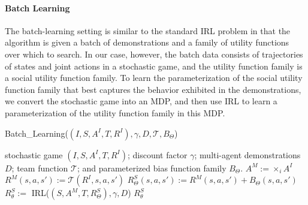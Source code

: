 
\vspace{\up}
\paragraph{Batch Learning}
\label{sec:batch}

The batch-learning setting is similar to the standard IRL problem in
that the algorithm is given a batch of demonstrations and a family of
utility functions over which to search. In our case, however, the batch
data consists of trajectories of states and joint actions in a
stochastic game, and the utility function family is a social utility
function family.  To learn the parameterization of the social utility
function family that best captures the behavior exhibited in the
demonstrations, we convert the stochastic game into an MDP,
and then use IRL to learn a parameterization of the utility function
family in this MDP.

\begin{algorithm}[t]
\caption{Batch\_Learning($(I,S,A^I,T,R^I), \gamma, D, {\mathcal T}, B_\Theta$)}
\label{alg:srl}
\begin{algorithmic}
\Require stochastic game $(I,S,A^I,T,R^I)$; discount factor $\gamma$; multi-agent demonstrations $D$; team function ${\mathcal T}$; and parameterized bias function family $B_\Theta$.
\State $A^M := \times_i A^I$ 
\State $R^M(s, a, s') := {\mathcal T}(R^I, s, a, s')$ 
\State $R^S_\Theta(s, a, s') := R^M(s, a, s') + B_\Theta(s, a, s')$ 
\State $R^S_\theta :=$ IRL($(S,A^M,T,R^S_\Theta), \gamma, D$)
\State \Return $R^S_\theta$ 
\end{algorithmic}
\end{algorithm}

